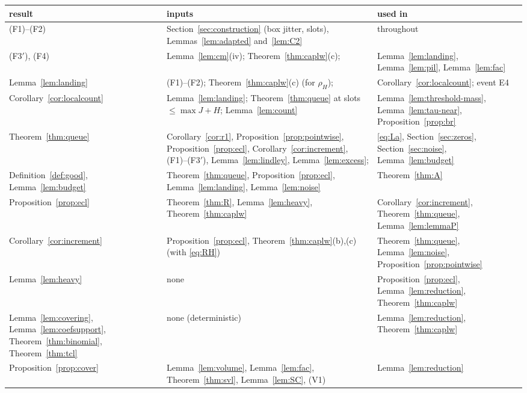 \begin{table}[ht]
\centering\small
\renewcommand{\arraystretch}{1.15}
\begin{tabular}{@{}p{}p{}p{}@{}}
\hline
result & inputs & used in\\
\hline
(F1)--(F2) & Section~\ref{sec:construction} (box jitter, slots), Lemmas~\ref{lem:adapted} and~\ref{lem:C2} & throughout\\
(F3$'$), (F4) & Lemma~\ref{lem:cm}(iv); Theorem~\ref{thm:caplw}(c); \cite{RosserSchoenfeld1962} & Lemma~\ref{lem:landing}, Lemma~\ref{lem:pil},
  Lemma~\ref{lem:fac}\\
Lemma~\ref{lem:landing} & (F1)--(F2); Theorem~\ref{thm:caplw}(c) (for $\rho_H$); \cite{Freedman1975} & Corollary~\ref{cor:localcount}; event E4\\
Corollary~\ref{cor:localcount} & Lemma~\ref{lem:landing}; Theorem~\ref{thm:queue} at slots $\le\max J+H$; Lemma~\ref{lem:count} &
  Lemma~\ref{lem:threshold-mass}, Lemma~\ref{lem:tau-near}, Proposition~\ref{prop:br}\\
Theorem~\ref{thm:queue} & Corollary~\ref{cor:r1}, Proposition~\ref{prop:pointwise}, Proposition~\ref{prop:ecl}, Corollary~\ref{cor:increment}, (F1)--(F3$'$),
  Lemma~\ref{lem:lindley}, Lemma~\ref{lem:excess}; \cite{Freedman1975} & \eqref{eq:La}, Section~\ref{sec:zeros}, Section~\ref{sec:noise},
  Lemma~\ref{lem:budget}\\
Definition~\ref{def:good}, Lemma~\ref{lem:budget} & Theorem~\ref{thm:queue}, Proposition~\ref{prop:ecl}, Lemma~\ref{lem:landing}, Lemma~\ref{lem:noise} & Theorem~\ref{thm:A}\\
Proposition~\ref{prop:ecl} & Theorem~\ref{thm:R}, Lemma~\ref{lem:heavy}, Theorem~\ref{thm:caplw} & Corollary~\ref{cor:increment}, Theorem~\ref{thm:queue},
  Lemma~\ref{lem:lemmaP}\\
Corollary~\ref{cor:increment} & Proposition~\ref{prop:ecl}, Theorem~\ref{thm:caplw}(b),(c) (with \eqref{eq:RH}) & Theorem~\ref{thm:queue}, Lemma~\ref{lem:noise}, Proposition~\ref{prop:pointwise}\\
Lemma~\ref{lem:heavy} & none & Proposition~\ref{prop:ecl}, Lemma~\ref{lem:reduction}, Theorem~\ref{thm:caplw}\\
Lemma~\ref{lem:covering}, Lemma~\ref{lem:coefsupport}, Theorem~\ref{thm:binomial}, Theorem~\ref{thm:tcl} & none (deterministic) &
  Lemma~\ref{lem:reduction}, Theorem~\ref{thm:caplw}\\
Proposition~\ref{prop:cover} & Lemma~\ref{lem:volume}, Lemma~\ref{lem:fac}, Theorem~\ref{thm:svl}, Lemma~\ref{lem:SC}, (V1) & Lemma~\ref{lem:reduction}\\

\end{tabular}
\end{table}
